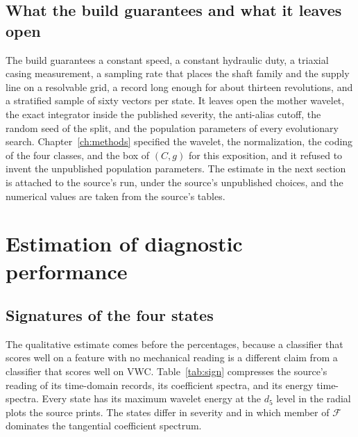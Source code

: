 \subsection{What the build guarantees and what it leaves open}

The build guarantees a constant speed, a constant hydraulic duty, a triaxial casing measurement, a sampling rate that places the shaft family and the supply line on a resolvable grid, a record long enough for about thirteen revolutions, and a stratified sample of sixty vectors per state.
It leaves open the mother wavelet, the exact integrator inside the published severity, the anti-alias cutoff, the random seed of the split, and the population parameters of every evolutionary search.
Chapter~\ref{ch:methods} specified the wavelet, the normalization, the coding of the four classes, and the box of \((C, g)\) for this exposition, and it refused to invent the unpublished population parameters.
The estimate in the next section is attached to the source's run, under the source's unpublished choices, and the numerical values are taken from the source's tables.

\section{Estimation of diagnostic performance}
\label{sec:estimate}

\subsection{Signatures of the four states}
\label{sec:signatures}

The qualitative estimate comes before the percentages, because a classifier that scores well on a feature with no mechanical reading is a different claim from a classifier that scores well on VWC.
Table~\ref{tab:sign} compresses the source's reading of its time-domain records, its coefficient spectra, and its energy time-spectra.
Every state has its maximum wavelet energy at the \(d_{5}\) level in the radial plots the source prints.
The states differ in severity and in which member of \(\mathcal{F}\) dominates the tangential coefficient spectrum.

